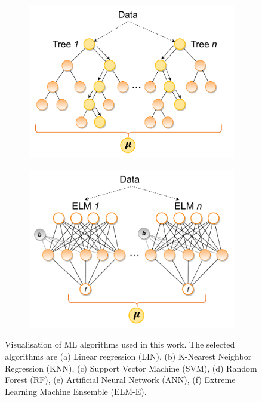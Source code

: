 \begin{figure}[tb]
{\begin{subfigure}[t]{.35\textwidth}
  \includegraphics[width=.95\linewidth]{images/Figs/RF.pdf}
  \label{fig:rf}
\end{subfigure}
\begin{subfigure}[t]{.35\textwidth}
  \centering
  \includegraphics[width=.95\linewidth]{images/Figs/ELM_E.pdf}
  \label{fig:elme}
\end{subfigure}
}
\caption{Visualisation of ML algorithms used in this work. The selected algorithms are (a) Linear regression (LIN), (b) K-Nearest Neighbor Regression (KNN), (c) Support Vector Machine (SVM), (d) Random Forest (RF), (e) Artificial Neural Network (ANN), (f) Extreme Learning Machine Ensemble (ELM-E).}
\label{fig:ml_algorithms}
\end{figure}

